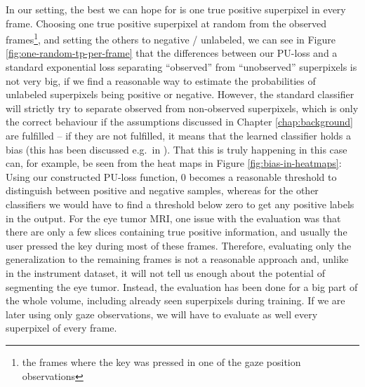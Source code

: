 In our setting, the best we can hope for is one true positive superpixel in every frame. 
Choosing one true positive superpixel at random from the observed frames\footnote{the frames where the key was pressed in one of the gaze position observations}, and setting the others to negative / unlabeled, we can see in Figure \ref{fig:one-random-tp-per-frame} that the differences between our PU-loss and a standard exponential loss separating ``observed'' from ``unobserved'' superpixels is not very big, if we find a reasonable way to estimate the probabilities  of unlabeled superpixels being positive or negative. 
However, the standard classifier will strictly try to separate observed from non-observed superpixels, which is only the correct behaviour if the assumptions discussed in Chapter \ref{chap:background} are fulfilled -- if they are not fulfilled, it means that the learned classifier holds a bias (this has been discussed e.g.\ in ). 
That this is truly happening in this case can, for example, be seen from the heat maps in Figure \ref{fig:bias-in-heatmaps}: Using our constructed PU-loss function, 0 becomes a reasonable threshold to distinguish between positive and negative samples, whereas for the other classifiers we would have to find a threshold below zero to get any positive labels in the output. 
For the eye tumor MRI, one issue with the evaluation was that there are only a few slices containing true positive information, and usually the user pressed the key during most of these frames. 
Therefore, evaluating only the generalization to the remaining frames is not a reasonable approach and, unlike in the instrument dataset, it will not tell us enough about the potential of segmenting the eye tumor. 
Instead, the evaluation has been done for a big part of the whole volume, including already seen superpixels during training. 
If we are later using only gaze observations, we will have to evaluate as well every superpixel of every frame.

